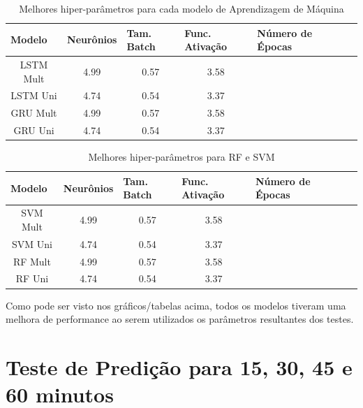 \begin{table}[H]
    \caption{Melhores hiper-parâmetros para cada modelo de Aprendizagem de Máquina}
    \label{table:hiper-param-lstm}
    \begin{center}
    \begin{tabular}{ccccccc}
    \hline
    \multicolumn{1}{l}{\textbf{Modelo}} & \multicolumn{1}{l}{\textbf{Neurônios}} & \multicolumn{1}{l}{\textbf{Tam. Batch}} & \multicolumn{1}{l}{\textbf{Func. Ativação}} & \multicolumn{1}{l}{\textbf{Número de Épocas}}\\
    \hline
    LSTM Mult & 4.99 &  0.57 & 3.58  \\ 
    LSTM Uni & 4.74 &  0.54 & 3.37  \\
    GRU Mult & 4.99 &  0.57 & 3.58  \\ 
    GRU Uni & 4.74 &  0.54 & 3.37  \\
    \hline
    \end{tabular}
    \end{center}
\end{table}


\begin{table}[H]
    \caption{Melhores hiper-parâmetros para RF e SVM}
    \label{table:hiper-param}
    \begin{center}
    \begin{tabular}{ccccccc}
    \hline
    \multicolumn{1}{l}{\textbf{Modelo}} & \multicolumn{1}{l}{\textbf{Neurônios}} & \multicolumn{1}{l}{\textbf{Tam. Batch}} & \multicolumn{1}{l}{\textbf{Func. Ativação}} & \multicolumn{1}{l}{\textbf{Número de Épocas}}\\
    \hline
    SVM Mult & 4.99 &  0.57 & 3.58  \\ 
    SVM Uni & 4.74 &  0.54 & 3.37  \\
    RF Mult & 4.99 &  0.57 & 3.58  \\ 
    RF Uni & 4.74 &  0.54 & 3.37  \\
    \hline
    \end{tabular}
    \end{center}
\end{table}



Como pode ser visto nos gráficos/tabelas acima, todos os modelos tiveram uma melhora de performance ao serem utilizados os parâmetros resultantes dos testes.

\section{Teste de Predição para 15, 30, 45 e 60 minutos}

